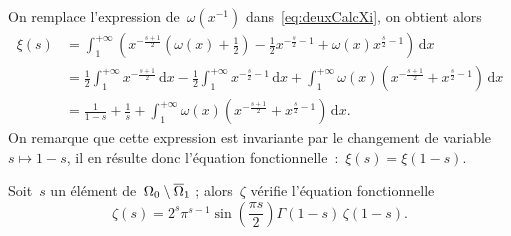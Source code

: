 \begin{dem}
			 On remplace l'expression de~$\omega(x^{-1})$ dans~\eqref{eq:deuxCalcXi}, on obtient alors 
			\begin{align*}
						\xi(s)
				&	=	\int_{1}^{+\infty} \left( x^{ -\frac{s+1}{2}} \left( \omega(x) +
							\frac{1}{2}\right) - \frac{1}{2}x^{-\frac{s}{2}-1} + \omega(x) x^{\frac{s}{2}-1} \right)\,\mathrm{d}x		\\
				&	=	\frac{1}{2}\int_{1}^{+\infty} x^{-\frac{s+1}{2}}\,\mathrm{d}x
							-\frac{1}{2}\int_{1}^{+\infty} x^{-\frac{s}{2}-1}\,\mathrm{d}x
							+\int_{1}^{+\infty} \omega(x)\left( x^{-\frac{s+1}{2}} + x^{\frac{s}{2}-1}\right)\,\mathrm{d}x			\\
				&	=	\frac{1}{1-s} + \frac{1}{s} +
							\int_{1}^{+\infty} \omega(x)\left( x^{-\frac{s+1}{2}} + x^{\frac{s}{2}-1}\right)\,\mathrm{d}x.
			\end{align*}
			On remarque que cette expression est invariante par le changement de variable~$s\mapsto 1-s$, il en résulte donc l'équation fonctionnelle~:~$\xi(s) = \xi(1-s)$.
		\end{dem}
		\begin{thm}	\label{thm:EquaFonctZeta}
			Soit~$s$ un élément de~$\Omega_0\setminus\overline{\Omega}_1$ ; alors~$\zeta$ vérifie l'équation fonctionnelle
			\[
				\zeta(s) = 2^s \pi^{s-1} \sin\left( \frac{\pi s}{2} \right) \Gamma(1-s)\, \zeta(1-s).
			\]
		\end{thm}
